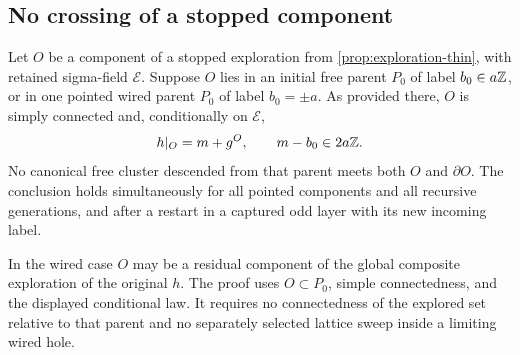 \subsection{No crossing of a stopped component}

\begin{proposition}[No crossing]
\label{prop:no-crossing}
Let \(O\) be a component of a stopped exploration from
\cref{prop:exploration-thin}, with retained sigma-field \(\mathscr E\).
Suppose \(O\) lies in an initial free parent \(P_0\) of label \(b_0\in a\mathbb Z\), or in
one pointed wired parent \(P_0\) of label \(b_0=\pm a\). As provided there,
\(O\) is simply connected and, conditionally on \(\mathscr E\),
\[
              h|_O=m+g^O,\qquad m-b_0\in2a\mathbb Z.
\]
No canonical free cluster descended from that parent meets both \(O\)
and \(\partial O\). The conclusion holds simultaneously for all
pointed components and all recursive generations, and after a restart
in a captured odd layer with its new incoming label.

In the wired case \(O\) may be a residual component of the global
composite exploration of the original \(h\). The proof uses
\(O\subset P_0\), simple connectedness, and the
displayed conditional law. It requires no connectedness of the
explored set relative to that parent and no separately selected
lattice sweep inside a limiting wired hole.
\end{proposition}

